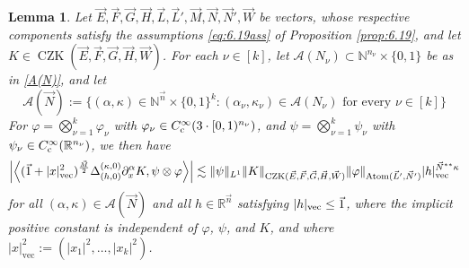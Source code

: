 \documentclass[11pt, reqno]{amsart}
\newtheorem{lemma}[theorem]{Lemma}
\theoremstyle{definition}
\theoremstyle{remark}
\numberwithin{equation}{section}
\newcommand{\vE}{\vec E}
\newcommand{\vF}{\vec F}
\newcommand{\N}{\mathbb N}
\newcommand{\R}{\mathbb R}
\newcommand{\vone}{\vec 1}
\newcommand{\vn}{\vec n}
\newcommand{\abs}[1]{|#1|}
\newcommand{\Norm}[2]{\|#1\|_{#2}}
\begin{document}
\begin{lemma}\label{lem:6.19k}
Let $\vE,\vF,\vec G,\vec H,\vec L,\vec L',\vec M,\vec N,\vec N',\vec W$ be vectors, whose respective components satisfy the assumptions \eqref{eq:6.19ass} of Proposition \ref{prop:6.19},
and let $K\in\operatorname{CZK}(\vE,\vF,\vec G,\vec H,\vec W)$.
For each $\nu\in[k]$, let $\mathscr A(N_\nu)\subset\N^{n_\nu}\times\{0,1\}$
be as in \eqref{A(N)}, and let
\begin{equation*}
   \mathscr A(\vec N)
   :=\Big\{(\alpha,\kappa)\in\N^{\vn}\times\{0,1\}^k:
      (\alpha_\nu,\kappa_\nu)\in\mathscr A(N_{\nu})\text{ for every }\nu\in[k]\Big\}
\end{equation*}
For $\varphi=\bigotimes_{\nu=1}^k\varphi_\nu$ with $\varphi_\nu\in C_{\rm c}^\infty(3\cdot [0,1)^{n_\nu})$, and $\psi=\bigotimes_{\nu=1}^k\psi_\nu$ with $\psi_\nu\in C_{\rm c}^\infty(\R^{n_\nu})$, we then have
\begin{equation}\label{eq:6.19k}
  \Big|\Big\langle(\vec1+\abs{x}_{\mathrm{vec}}^2)^{\frac{\vec M}{2}}\Delta_{(h,0)}^{(\kappa,0)}\partial_x^\alpha K,{\psi\otimes \varphi}\Big\rangle\Big|
  \lesssim\Norm{\psi}{L^1}\Norm{K}{\operatorname{CZK}(\vE,\vF,\vec G,\vec H,\vec W)}
  \Norm{\varphi}{\operatorname{Atom}(\vec L',\vec N')}
  \abs{h}_{\rm{vec}}^{\vec N^{**}\kappa}
\end{equation}
for all $(\alpha,\kappa)\in\mathscr A(\vec N)$ and all $h\in\R^{\vn}$
satisfying $\abs{h}_{\rm{vec}}\leq\vone$,
where the implicit positive constant is independent of $\varphi$, $\psi$, and $K$, and where $|x|_{\mathrm{vec}}^2:=(|x_1|^2,\ldots,|x_k|^2)$.
\end{lemma}
\end{document}

